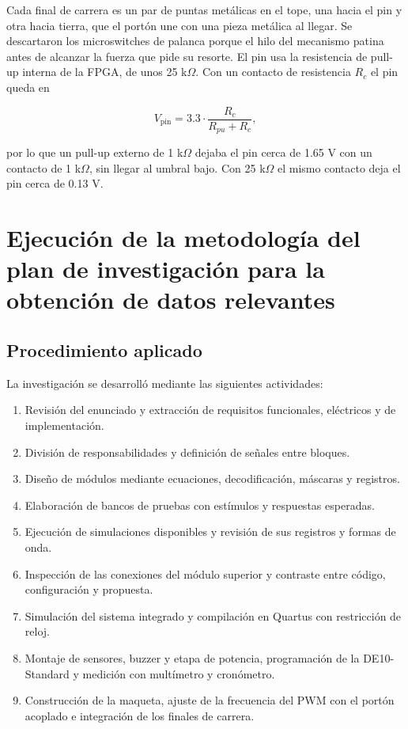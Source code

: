 \documentclass[12pt,letterpaper]{article}
\begin{document}
Cada final de carrera es un par de puntas metálicas en el
tope, una hacia el pin y otra hacia tierra, que el portón
une con una pieza metálica al llegar. Se descartaron los
microswitches de palanca porque el hilo del mecanismo
patina antes de alcanzar la fuerza que pide su resorte.
El pin usa la resistencia de pull-up interna de la FPGA,
de unos 25 k$\Omega$. Con un contacto de resistencia
$R_c$ el pin queda en

\begin{equation}
V_{\mathrm{pin}}=3.3\cdot\frac{R_c}{R_{pu}+R_c},
\end{equation}

por lo que un pull-up externo de 1 k$\Omega$ dejaba el
pin cerca de 1.65 V con un contacto de 1 k$\Omega$, sin
llegar al umbral bajo. Con 25 k$\Omega$ el mismo contacto
deja el pin cerca de 0.13 V.


\section{Ejecución de la metodología del plan de investigación
para la obtención de datos relevantes}

\subsection{Procedimiento aplicado}

La investigación se desarrolló mediante las siguientes
actividades:

\begin{enumerate}
    \item Revisión del enunciado y extracción de requisitos
    funcionales, eléctricos y de implementación.
    \item División de responsabilidades y definición de
    señales entre bloques.
    \item Diseño de módulos mediante ecuaciones,
    decodificación, máscaras y registros.
    \item Elaboración de bancos de pruebas con estímulos
    y respuestas esperadas.
    \item Ejecución de simulaciones disponibles y revisión
    de sus registros y formas de onda.
    \item Inspección de las conexiones del módulo superior
    y contraste entre código, configuración y propuesta.
    \item Simulación del sistema integrado y compilación
    en Quartus con restricción de reloj.
    \item Montaje de sensores, buzzer y etapa de potencia,
    programación de la DE10-Standard y medición con
    multímetro y cronómetro.
    \item Construcción de la maqueta, ajuste de la
    frecuencia del PWM con el portón acoplado e
    integración de los finales de carrera.
\end{enumerate}
\end{document}
